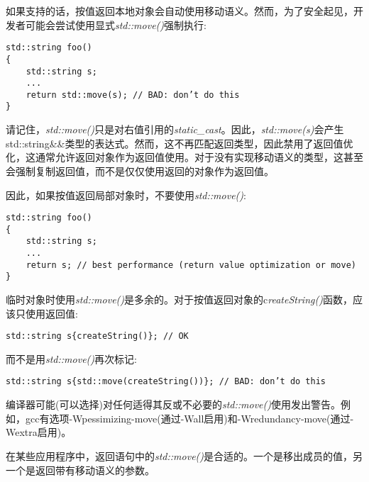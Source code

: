 如果支持的话，按值返回本地对象会自动使用移动语义。然而，为了安全起见，开发者可能会尝试使用显式\textit{std::move()}强制执行:\par

\begin{lstlisting}[caption={}]
std::string foo()
{
	std::string s;
	...
	return std::move(s); // BAD: don’t do this
}
\end{lstlisting}

请记住，\textit{std::move()}只是对右值引用的\textit{static\_cast}。因此，\textit{std::move(s)}会产生std::string\&\&类型的表达式。然而，这不再匹配返回类型，因此禁用了返回值优化，这通常允许返回对象作为返回值使用。对于没有实现移动语义的类型，这甚至会强制复制返回值，而不是仅仅使用返回的对象作为返回值。\par

因此，如果按值返回局部对象时，不要使用\textit{std::move()}:\par

\begin{lstlisting}[caption={}]
std::string foo()
{
	std::string s;
	...
	return s; // best performance (return value optimization or move)
}
\end{lstlisting}

临时对象时使用\textit{std::move()}是多余的。对于按值返回对象的c\textit{reateString()}函数，应该只使用返回值:\par

\begin{lstlisting}[caption={}]
std::string s{createString()}; // OK
\end{lstlisting}

而不是用\textit{std::move()}再次标记:\par

\begin{lstlisting}[caption={}]
std::string s{std::move(createString())}; // BAD: don’t do this
\end{lstlisting}

编译器可能(可以选择)对任何适得其反或不必要的\textit{std::move()}使用发出警告。例如，gcc有选项-Wpessimizing-move(通过-Wall启用)和-Wredundancy-move(通过-Wextra启用)。\par

在某些应用程序中，返回语句中的\textit{std::move()}是合适的。一个是移出成员的值，另一个是返回带有移动语义的参数。\par
















